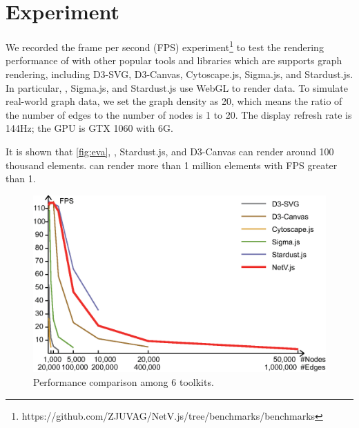 \section{Experiment}\label{sec:experiment}
We recorded the frame per second (FPS) experiment\footnote{https://github.com/ZJUVAG/NetV.js/tree/benchmarks/benchmarks} to test the rendering performance of \name with other popular tools and libraries which are supports graph rendering, including D3-SVG, D3-Canvas, Cytoscape.js, Sigma.js, and Stardust.js. In particular, \name, Sigma.js, and Stardust.js use WebGL to render data. To simulate real-world graph data, we set the graph density as 20, which means the ratio of the number of edges to the number of nodes is 1 to 20. The display refresh rate is 144Hz; the GPU is GTX 1060 with 6G.


It is shown that \autoref{fig:eva}, \name, Stardust.js, and D3-Canvas can render around 100 thousand elements. \name can render more than 1 million elements with FPS greater than 1.

\begin{figure}[htbp]
    \includegraphics[width=\linewidth]{fig/eva.eps}
    \caption{
        Performance comparison among 6 toolkits.
    }
    \label{fig:eva}
\end{figure}
